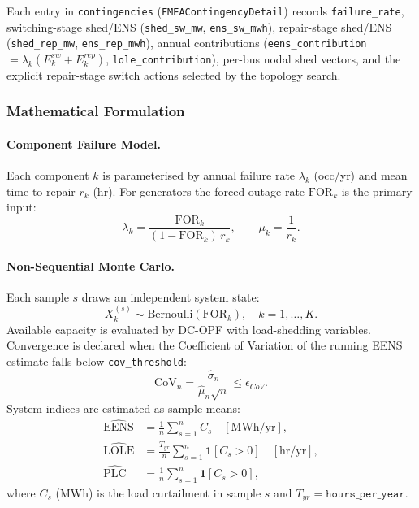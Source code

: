 Each entry in \texttt{contingencies} (\texttt{FMEAContingencyDetail}) records
\texttt{failure\_rate}, switching-stage shed/ENS (\texttt{shed\_sw\_mw},
\texttt{ens\_sw\_mwh}), repair-stage shed/ENS (\texttt{shed\_rep\_mw},
\texttt{ens\_rep\_mwh}), annual contributions
(\texttt{eens\_contribution} $= \lambda_k(E^{sw}_k + E^{rep}_k)$,
\texttt{lole\_contribution}), per-bus nodal shed vectors, and the explicit
repair-stage switch actions selected by the topology search.

\subsubsection{Mathematical Formulation}

\paragraph{Component Failure Model.}
Each component $k$ is parameterised by annual failure rate $\lambda_k$
(occ/yr) and mean time to repair $r_k$ (hr).  For generators the forced
outage rate $\mathrm{FOR}_k$ is the primary input:
\begin{equation}
  \lambda_k = \frac{\mathrm{FOR}_k}{(1 - \mathrm{FOR}_k)\,r_k}, \qquad
  \mu_k = \frac{1}{r_k}.
\end{equation}

\paragraph{Non-Sequential Monte Carlo.}
Each sample $s$ draws an independent system state:
\begin{equation}
  X_k^{(s)} \sim \mathrm{Bernoulli}\!\left(\mathrm{FOR}_k\right), \quad
  k = 1,\ldots,K.
\end{equation}
Available capacity is evaluated by DC-OPF with load-shedding variables.
Convergence is declared when the Coefficient of Variation of the running EENS
estimate falls below \texttt{cov\_threshold}:
\begin{equation}
  \mathrm{CoV}_n = \frac{\hat{\sigma}_n}{\hat{\mu}_n \sqrt{n}} \le \epsilon_{CoV}.
\end{equation}
System indices are estimated as sample means:
\begin{align}
  \widehat{\mathrm{EENS}} &= \frac{1}{n}\sum_{s=1}^{n} C_s
    \quad [\text{MWh/yr}], \\
  \widehat{\mathrm{LOLE}} &= \frac{T_{yr}}{n}\sum_{s=1}^{n} \mathbf{1}[C_s > 0]
    \quad [\text{hr/yr}], \\
  \widehat{\mathrm{PLC}} &= \frac{1}{n}\sum_{s=1}^{n} \mathbf{1}[C_s > 0],
\end{align}
where $C_s$ (MWh) is the load curtailment in sample $s$ and $T_{yr} =
\texttt{hours\_per\_year}$.

